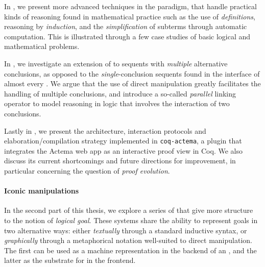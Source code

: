 In , we present more advanced techniques in the  paradigm,
that handle practical kinds of reasoning found in mathematical practice such as
the use of \emph{definitions}, reasoning by \emph{induction}, and the
\emph{simplification} of subterms through automatic computation. This is
illustrated through a few case studies of basic logical and mathematical
problems.

In , we investigate an extension of  to sequents with
\emph{multiple} alternative conclusions, as opposed to the
\emph{single}-conclusion sequents found in the interface of almost every . We
argue that the use of direct manipulation greatly facilitates the handling of
multiple conclusions, and introduce a so-called \emph{parallel} linking operator
to model reasoning in  logic that involves the interaction of two
conclusions.

Lastly in , we present the architecture, interaction protocols and
elaboration/compilation strategy implemented in \texttt{coq-actema}, a plugin
that integrates the Actema web app as an interactive proof view in Coq. We also
discuss its current shortcomings and future directions for improvement, in
particular concerning the question of \emph{proof evolution}.

\paragraph{Iconic manipulations}
  
In the second part of this thesis, we explore a series of   that give more structure to the notion of \emph{logical goal}. These
systems share the ability to represent goals in two alternative ways: either
\emph{textually} through a standard inductive syntax, or \emph{graphically}
through a metaphorical notation well-suited to direct manipulation. The first
can be used as a machine representation in the backend of an , and the latter
as the substrate for  in the frontend.

